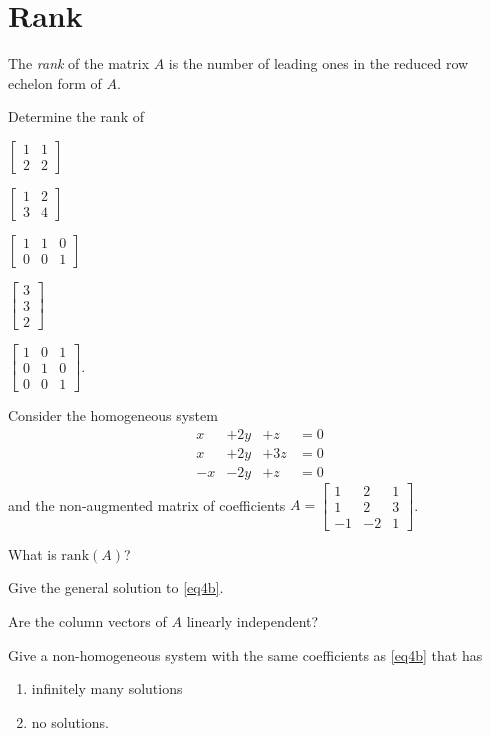 \documentclass[14pt]{problemset}
\newcommand{\Rank}{\mathrm{rank}}
\newcommand{\mat}[1]{\begin{bmatrix}#1\end{bmatrix}}
\begin{document}
\section*{Rank}
	\begin{definition}[Rank]
		The \emph{rank} of the matrix $A$ is the number of leading ones in the 
		reduced row echelon form of $A$.
	\end{definition}

	\question
	\begin{parts}
		\item Determine the rank of
		\begin{enumerate*}
			\item $\mat{1&1\\2&2}$
			\item $\mat{1&2\\3&4}$
			\item $\mat{1&1&0\\0&0&1}$
			\item $\mat{3\\3\\2}$
			\item $\mat{1&0&1\\0&1&0\\0&0&1}$.
		\end{enumerate*}
	\end{parts}
	
	\newpage
	\question
	Consider the homogeneous system 
		\begin{equation}\label{eq4b}
			\begin{array}{llll}
				x&+2y&+z &= 0\\
				x&+2y&+3z &= 0\\
				-x&-2y&+z &= 0
			\end{array}
		\end{equation}
	and the non-augmented matrix of coefficients $A=\mat{1&2&1\\1&2&3\\-1&-2&1}$.
	\begin{parts}
		\item What is $\Rank(A)$?
		\item Give the general solution to \eqref{eq4b}.
		\item Are the column vectors of $A$ linearly independent?
		\item Give a non-homogeneous system with the same coefficients as \eqref{eq4b} that has
			\begin{enumerate}
				\item infinitely many solutions
				\item no solutions.
			\end{enumerate}
	\end{parts}
\end{document}
